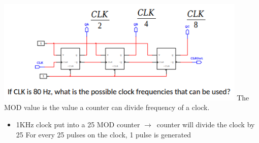 \documentclass[a4paper,12pt]{article}
\newcommand{\ra}{$\rightarrow$}
\begin{document}
            \includegraphics[width=12cm]{Freqdiv1.png}
            The MOD value is the value a counter can divide frequency of a clock.
            \begin{itemize}
                \item 1KHz clock put into a 25 MOD counter \ra~counter will divide the clock by 25 For every 25 pulses on the clock, 1 pulse is generated
            \end{itemize}
        
\end{document}
